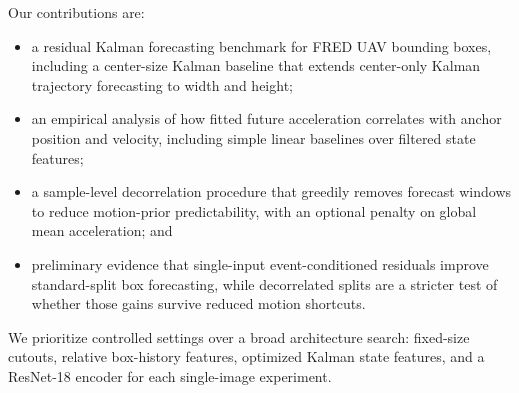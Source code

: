 Our contributions are:

\begin{itemize}
  \item a residual Kalman forecasting benchmark for FRED UAV bounding boxes, including a center-size Kalman baseline that extends center-only Kalman trajectory forecasting to width and height;
  \item an empirical analysis of how fitted future acceleration correlates with anchor position and velocity, including simple linear baselines over filtered state features;
  \item a sample-level decorrelation procedure that greedily removes forecast windows to reduce motion-prior predictability, with an optional penalty on global mean acceleration; and
  \item preliminary evidence that single-input event-conditioned residuals improve standard-split box forecasting, while decorrelated splits are a stricter test of whether those gains survive reduced motion shortcuts.
\end{itemize}

We prioritize controlled settings over a broad architecture search: fixed-size cutouts, relative box-history features, optimized Kalman state features, and a ResNet-18 encoder for each single-image experiment.
